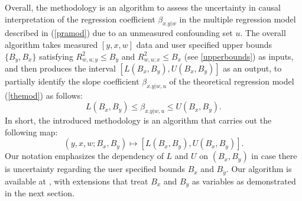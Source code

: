 \documentclass[11pt]{amsart}
\begin{document}
Overall, the methodology is an algorithm to assess the uncertainty in causal interpretation of the regression coefficient $\beta_{x.y|w}$ in the multiple regression model described in (\ref{pramod}) due to an unmeasured confounding set $u$. The overall algorithm takes measured $[y,x,w]$ data and user specified upper bounds $\{B_y,B_x\}$ satisfying $R^2_{w,u;y}\leq B_y$ and $R^2_{w,u;x}\leq B_x$ (see \ref{upperbounds}) as inputs, and then produces the interval $[L(B_x,B_y),U(B_x,B_y)]$ as an output, to partially identify the slope coefficient $\beta_{x.y|w,u}$ of the theoretical regression model (\ref{themod}) as follows: \begin{equation}\label{partialinterval}L(B_x,B_y)\leq \beta_{x.y|w,u}\leq U(B_x,B_y).\end{equation}
In short, the introduced methodology is an algorithm that carries out the following map:
\[(y,x,w;B_x,B_y)\mapsto [L(B_x,B_y),U(B_x,B_y)].\]
Our notation emphasizes the dependency of $L$ and $U$ on $(B_x,B_y)$ in case there is uncertainty regarding the user specified bounds $B_x$ and $B_y$. Our algorithm is available at \cite{Hughes25}, with extensions that treat $B_x$ and $B_y$ as variables as demonstrated in the next section.
%
\end{document}
